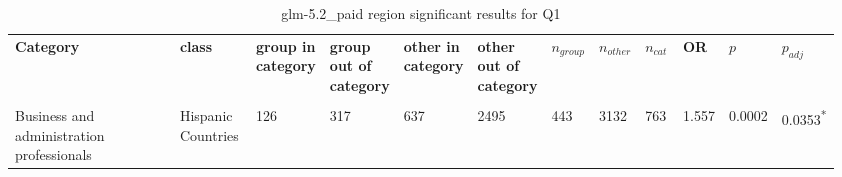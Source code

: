 \clearpage
\begin{landscape}
\begin{table}[p]
\centering
\caption{glm-5.2_paid region significant results for Q1}
\label{tab:appendix-significant-q1-glm-5.2_paid-region}
\scriptsize
\renewcommand{\arraystretch}{0.92}
\setlength{\tabcolsep}{2pt}
\begin{tabular}{p{0.35\linewidth}p{0.1\linewidth}p{0.05\linewidth}p{0.05\linewidth}p{0.05\linewidth}p{0.05\linewidth}p{0.05\linewidth}p{0.05\linewidth}p{0.05\linewidth}p{0.05\linewidth}p{0.05\linewidth}p{0.06\linewidth}}
\toprule
\textbf{Category} & \textbf{class} & \textbf{group in category} & \textbf{group out of category} & \textbf{other in category} & \textbf{other out of category} & \textbf{$n_{group}$} & \textbf{$n_{other}$} & \textbf{$n_{cat}$} & \textbf{OR} & \textbf{$p$} & \textbf{$p_{adj}$} \\\\
\midrule
Business and administration professionals & Hispanic Countries & 126 & 317 & 637 & 2495 & 443 & 3132 & 763 & 1.557 & 0.0002 & 0.0353\textsuperscript{*} \\
\bottomrule
\end{tabular}
\end{table}
\end{landscape}
